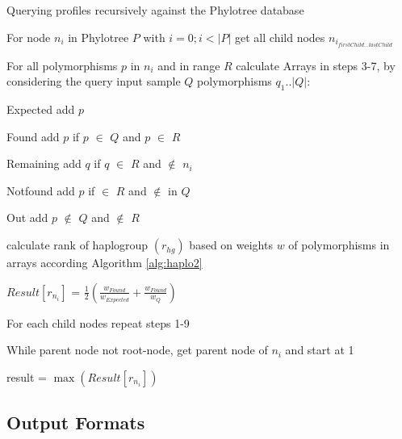 \begin{algorithm}
\caption{Querying profiles recursively against the Phylotree database}
\label{list:pseudo}

For node $n_{i}$ in Phylotree $P$ with $i=0; i<|P|$ get all child nodes $n_{i_{firstChild...lastChild}}$

For all polymorphisms $p$ in $n_{i}$ and in range $R$ calculate Arrays in steps 3-7, by considering the query input sample $Q$ polymorphisms $q_{1}..{|Q|}$:

Expected add $p$

Found add $p$ if $p$ $\in$ $Q$ and $p$ $\in$ $R$ 

Remaining add $q$ if $q$  $\in$ $R$ and $\not\in$ $n_{i}$

Notfound add $p$ if $\in$ $R$ and $\not\in$ in $Q$

Out add $p$ $\not\in$ $Q$ and $\not\in$ $R$

calculate rank of haplogroup $(r_{hg})$ based on weights $w$ of polymorphisms in arrays according Algorithm \ref{alg:haplo2}

$Result[r_{n_{i}}]$ = $ \frac{1}{2}\left(\frac{w_{Found}}{w_{Expected}} +  \frac{w_{Found}}{w_{Q}}\right)$

For each child nodes repeat steps 1-9

While parent node not root-node, get parent node of $n_{i}$ and start at 1

result = $\max (Result[r_{n_{i}}]) $

\end{algorithm}



\subsection{Output Formats}


